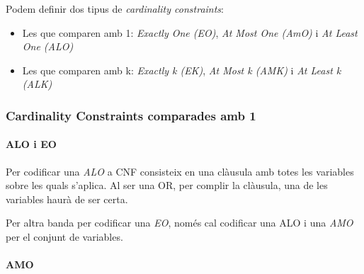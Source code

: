 \documentclass[11pt,a4paper,twoside]{report}
\begin{document}
  Podem definir dos tipus de \textit{cardinality constraints}:
  \begin{itemize}
    \item Les que comparen amb 1: \textit{Exactly One (EO)}, \textit{At Most One (AmO)} i \textit{At Least One (ALO)}
    \item Les que comparen amb k: \textit{Exactly k (EK)}, \textit{At Most k (AMK)} i \textit{At Least k (ALK)}
  \end{itemize}

  \subsubsection{Cardinality Constraints comparades amb 1}

  \paragraph*{ALO i EO}
  
  Per codificar una \textit{ALO} a CNF consisteix en una clàusula amb totes les variables sobre les quals s'aplica. Al ser una OR, per complir la clàusula, una de les variables haurà de ser certa.

  Per altra banda per codificar una \textit{EO}, només cal codificar una ALO i una \textit{AMO} per el conjunt de variables.
  
  \paragraph*{AMO}
\end{document}

